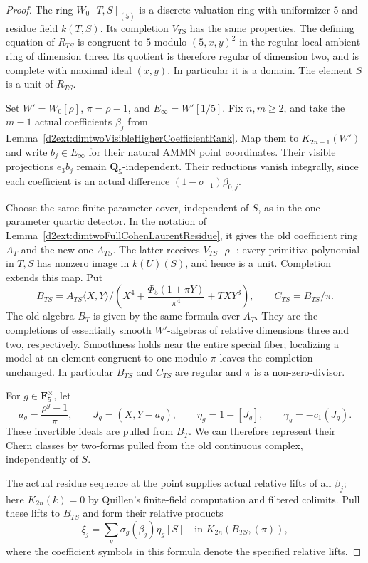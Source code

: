 \documentclass[11pt,a4paper]{amsart}
\numberwithin{equation}{section}
\theoremstyle{definition}
\theoremstyle{remark}
\begin{document}
\begin{proof}
The ring $W_0[T,S]_{(5)}$ is a discrete valuation ring with
uniformizer $5$ and residue field $k(T,S)$.  Its completion
$V_{TS}$ has the same properties.  The defining equation of
$R_{TS}$ is congruent to $5$ modulo $(5,x,y)^2$ in the regular
local ambient ring of dimension three.  Its quotient is
therefore regular of dimension two, and is complete with
maximal ideal $(x,y)$.  In particular it is a domain.
The element $S$ is a unit of $R_{TS}$.

Set $W'=W_0[\rho]$, $\pi=\rho-1$, and
$E_\infty=W'[1/5]$.  Fix $n,m\geq2$, and take the $m-1$
actual coefficients $\beta_j$ from
Lemma~\ref{d2ext:dimtwoVisibleHigherCoefficientRank}.
Map them to $K_{2n-1}(W')$ and write $b_j\in E_\infty$
for their natural AMMN point coordinates.  Their visible
projections $e_3b_j$ remain $\mathbf Q_5$-independent.
Their reductions vanish integrally, since each coefficient
is an actual difference $(1-\sigma_{-1})\beta_{0,j}$.

Choose the same finite parameter cover, independent of $S$,
as in the one-parameter quartic detector.  In the notation of
Lemma~\ref{d2ext:dimtwoFullCohenLaurentResidue}, it gives the old
coefficient ring $A_T$ and the new one $A_{TS}$.  The latter
receives $V_{TS}[\rho]$: every primitive polynomial in $T,S$
has nonzero image in $k(U)(S)$, and hence is a unit.  Completion
extends this map.  Put
\[
 B_{TS}=A_{TS}\langle X,Y\rangle/
 \left(X^4+\frac{\Phi_5(1+\pi Y)}{\pi^4}+TXY^3\right),
 \qquad C_{TS}=B_{TS}/\pi.
\]
The old algebra $B_T$ is given by the same formula over $A_T$.
They are the completions of essentially smooth $W'$-algebras
of relative dimensions three and two, respectively.
Smoothness holds near the entire special fiber; localizing a
model at an element congruent to one modulo $\pi$ leaves the
completion unchanged.  In particular $B_{TS}$ and $C_{TS}$
are regular and $\pi$ is a non-zero-divisor.

For $g\in\mathbf F_5^\times$, let
\[
 a_g=\frac{\rho^g-1}{\pi},\qquad
 J_g=(X,Y-a_g),\qquad
 \eta_g=1-[J_g],\qquad \gamma_g=-c_1(J_g).
\]
These invertible ideals are pulled from $B_T$.  We can therefore
represent their Chern classes by two-forms pulled from the old
continuous complex, independently of $S$.

The actual residue sequence at the point supplies actual
relative lifts of all $\beta_j$; here
$K_{2n}(k)=0$ by Quillen's finite-field computation and filtered
colimits.  Pull these lifts to $B_{TS}$ and form their relative
products
\[
 \xi_j=\sum_g\sigma_g(\beta_j)\eta_g[S]
       \quad\text{in }K_{2n}(B_{TS},(\pi)),
\]
where the coefficient symbols in this formula denote the
specified relative lifts.


\end{proof}
\end{document}
